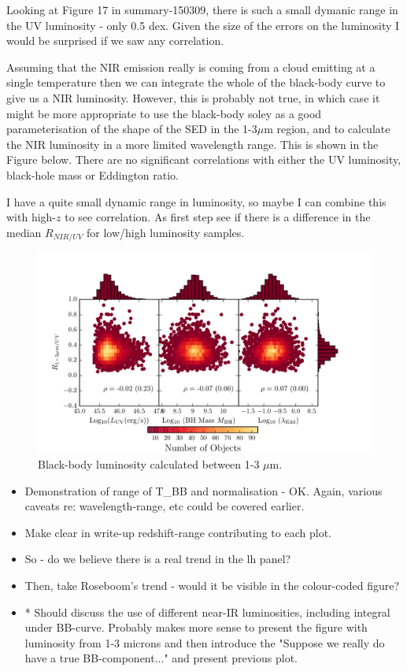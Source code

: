 Looking at Figure 17 in summary-150309, there is such a small dymanic range in the UV luminosity - only 0.5 dex. 
Given the size of the errors on the luminosity I would be surprised if we saw any correlation. 

Assuming that the NIR emission really is coming from a cloud emitting at a single temperature then we can integrate the whole of the black-body curve to give us a NIR luminosity. 
However, this is probably not true, in which case it might be more appropriate to use the black-body soley as a good parameterisation of the shape of the SED in the 1-3$\mu$m region, and to calculate the NIR luminosity in a more limited wavelength range. 
This is shown in the Figure below. 
There are no significant correlations with either the UV luminosity, black-hole mass or Eddington ratio. 

I have a quite small dynamic range in luminosity, so maybe I can combine this with high-$z$ to see correlation. 
As first step see if there is a difference in the median $R_{NIR/UV}$ for low/high luminosity samples. 


\begin{figure}
  \centering
  \includegraphics[width=\textwidth]{figures/chapter06/ratio_lowz_correlations.pdf}
  \caption{Black-body luminosity calculated between 1-3 $\mu$m.}
  \label{fig:}
\end{figure}

\begin{itemize}
\item Demonstration of range of T\_BB and normalisation - OK. Again, various caveats re: wavelength-range, etc could be covered earlier.
\item Make clear in write-up redshift-range contributing to each plot.
\item So - do we believe there is a real trend in the lh panel?
\item Then, take Roseboom's trend - would it be visible in the colour-coded figure?
\item* Should discuss the use of different near-IR luminosities, including integral under BB-curve. Probably makes more sense to present the figure with luminosity from 1-3 microns and then introduce the "Suppose we really do have a true BB-component..." and present previous plot.
\end{itemize}

